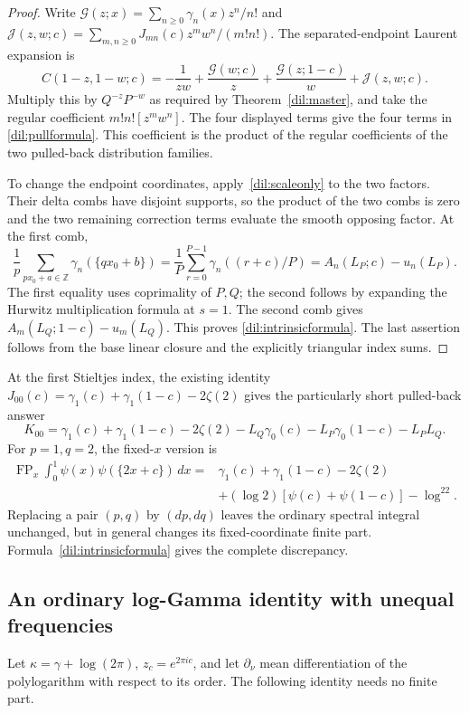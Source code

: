 \begin{proof}
Write $\mathcal G(z;x)=\sum_{n\geq0}\gamma_n(x)z^n/n!$ and
$\mathcal J(z,w;c)=\sum_{m,n\geq0}J_{mn}(c)z^mw^n/(m!n!)$.
The separated-endpoint Laurent expansion is
\[
 C(1-z,1-w;c)=-\frac1{zw}
       +\frac{\mathcal G(w;c)}z
       +\frac{\mathcal G(z;1-c)}w+\mathcal J(z,w;c).
\]
Multiply this by $Q^{-z}P^{-w}$ as required by
Theorem~\ref{dil:master}, and take the regular coefficient $m!n![z^mw^n]$.
The four displayed terms give the four terms in
\eqref{dil:pullformula}. This coefficient is the product of the regular
coefficients of the two pulled-back distribution families.

To change the endpoint coordinates, apply~\eqref{dil:scaleonly} to the
two factors. Their delta combs have disjoint supports, so the product of
the two combs is zero and the two remaining correction terms evaluate
the smooth opposing factor. At the first comb,
\[
 \frac1p\sum_{px_0+a\in\mathbb Z}\gamma_n(\{qx_0+b\})
 =\frac1P\sum_{r=0}^{P-1}\gamma_n((r+c)/P)
 =A_n(L_P;c)-u_n(L_P).
\]
The first equality uses coprimality of $P,Q$; the second follows by
expanding the Hurwitz multiplication formula at $s=1$. The second comb
gives $A_m(L_Q;1-c)-u_m(L_Q)$. This proves
\eqref{dil:intrinsicformula}. The last assertion follows from the base
linear closure and the explicitly triangular index sums.
\end{proof}

At the first Stieltjes index, the existing identity
$J_{00}(c)=\gamma_1(c)+\gamma_1(1-c)-2\zeta(2)$ gives the particularly
short pulled-back answer
\[
 K_{00}=\gamma_1(c)+\gamma_1(1-c)-2\zeta(2)
       -L_Q\gamma_0(c)-L_P\gamma_0(1-c)-L_PL_Q.
\]
For $p=1,q=2$, the fixed-$x$ version is
\begin{align*}
 \operatorname{FP}_x\int_0^1\psi(x)\psi(\{2x+c\})\,dx
 ={}&\gamma_1(c)+\gamma_1(1-c)-2\zeta(2)\\
 &+(\log2)[\psi(c)+\psi(1-c)]-\log^22.
\end{align*}
Replacing a pair $(p,q)$ by $(dp,dq)$ leaves the ordinary spectral
integral unchanged, but in general changes its fixed-coordinate finite
part. Formula~\eqref{dil:intrinsicformula} gives the complete discrepancy.

\subsection{An ordinary log-Gamma identity with unequal frequencies}
Let $\kappa=\gamma+\log(2\pi)$, $z_c=e^{2\pi ic}$, and let
$\partial_\nu$ mean differentiation of the polylogarithm with respect
to its order. The following identity needs no finite part.

